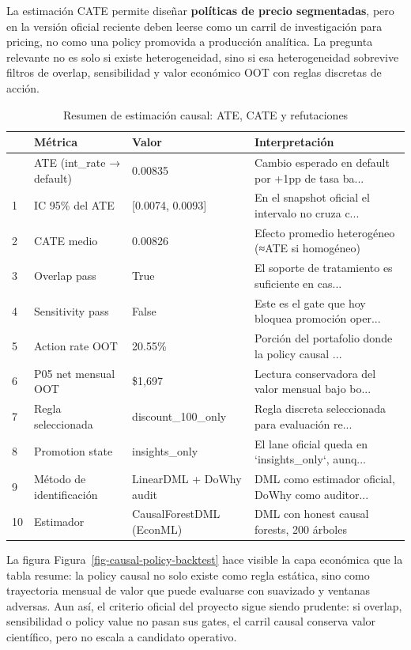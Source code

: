 \documentclass[
  spanish,
  11pt,
  letterpaper,
]{scrbook}
\theoremstyle{plain}
\theoremstyle{remark}
\begin{document}
La estimación CATE permite diseñar \textbf{políticas de precio
segmentadas}, pero en la versión oficial reciente deben leerse como un
carril de investigación para pricing, no como una policy promovida a
producción analítica. La pregunta relevante no es solo si existe
heterogeneidad, sino si esa heterogeneidad sobrevive filtros de overlap,
sensibilidad y valor económico OOT con reglas discretas de acción.

{

\begin{longtable}[]{@{}llll@{}}

\caption{\label{tbl-causal-summary}Resumen de estimación causal: ATE,
CATE y refutaciones}

\tabularnewline

\toprule\noalign{}
& Métrica & Valor & Interpretación \\
\midrule\noalign{}
\endhead
\bottomrule\noalign{}
\endlastfoot
0 & ATE (int\_rate → default) & 0.00835 & Cambio esperado en default por
+1pp de tasa ba... \\
1 & IC 95\% del ATE & {[}0.0074, 0.0093{]} & En el snapshot oficial el
intervalo no cruza c... \\
2 & CATE medio & 0.00826 & Efecto promedio heterogéneo (≈ATE si
homogéneo) \\
3 & Overlap pass & True & El soporte de tratamiento es suficiente en
cas... \\
4 & Sensitivity pass & False & Este es el gate que hoy bloquea promoción
oper... \\
5 & Action rate OOT & 20.55\% & Porción del portafolio donde la policy
causal ... \\
6 & P05 net mensual OOT & \$1,697 & Lectura conservadora del valor
mensual bajo bo... \\
7 & Regla seleccionada & discount\_100\_only & Regla discreta
seleccionada para evaluación re... \\
8 & Promotion state & insights\_only & El lane oficial queda en
`insights\_only`, aunq... \\
9 & Método de identificación & LinearDML + DoWhy audit & DML como
estimador oficial, DoWhy como auditor... \\
10 & Estimador & CausalForestDML (EconML) & DML con honest causal
forests, 200 árboles \\

\end{longtable}

}

La figura Figura~\ref{fig-causal-policy-backtest} hace visible la capa
económica que la tabla resume: la policy causal no solo existe como
regla estática, sino como trayectoria mensual de valor que puede
evaluarse con suavizado y ventanas adversas. Aun así, el criterio
oficial del proyecto sigue siendo prudente: si overlap, sensibilidad o
policy value no pasan sus gates, el carril causal conserva valor
científico, pero no escala a candidato operativo.
\end{document}
